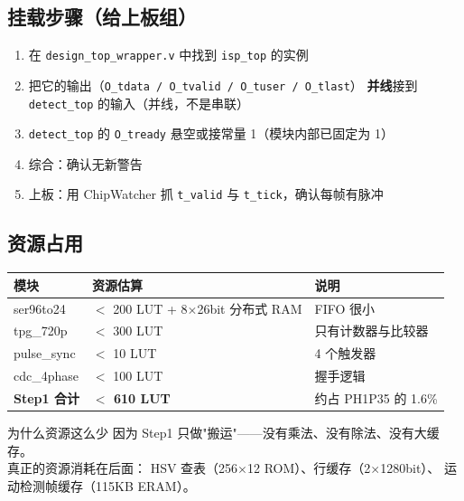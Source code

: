 \subsection{挂载步骤（给上板组）}

\begin{enumerate}
  \item 在 \texttt{design\_top\_wrapper.v} 中找到 \texttt{isp\_top} 的实例
  \item 把它的输出（\texttt{O\_tdata / O\_tvalid / O\_tuser / O\_tlast}）
        \textbf{并线}接到 \texttt{detect\_top} 的输入（并线，不是串联）
  \item \texttt{detect\_top} 的 \texttt{O\_tready} 悬空或接常量 1（模块内部已固定为 1）
  \item 综合：确认无新警告
  \item 上板：用 ChipWatcher 抓 \texttt{t\_valid} 与 \texttt{t\_tick}，确认每帧有脉冲
\end{enumerate}

\subsection{资源占用}

\begin{center}
\renewcommand{\arraystretch}{1.25}
\begin{tabular}{lll}
\toprule
\textbf{模块} & \textbf{资源估算} & \textbf{说明} \\
\midrule
ser96to24 & $<$ 200 LUT + 8$\times$26bit 分布式 RAM & FIFO 很小 \\
tpg\_720p & $<$ 300 LUT & 只有计数器与比较器 \\
pulse\_sync & $<$ 10 LUT & 4 个触发器 \\
cdc\_4phase & $<$ 100 LUT & 握手逻辑 \\
\midrule
\textbf{Step1 合计} & \textbf{$<$ 610 LUT} & 约占 PH1P35 的 1.6\% \\
\bottomrule
\end{tabular}
\end{center}

\begin{tipbox}{为什么资源这么少}
因为 Step1 只做"搬运"——没有乘法、没有除法、没有大缓存。\\[4pt]
真正的资源消耗在后面：
HSV 查表（256$\times$12 ROM）、行缓存（2$\times$1280bit）、
运动检测帧缓存（115KB ERAM）。
\end{tipbox}
